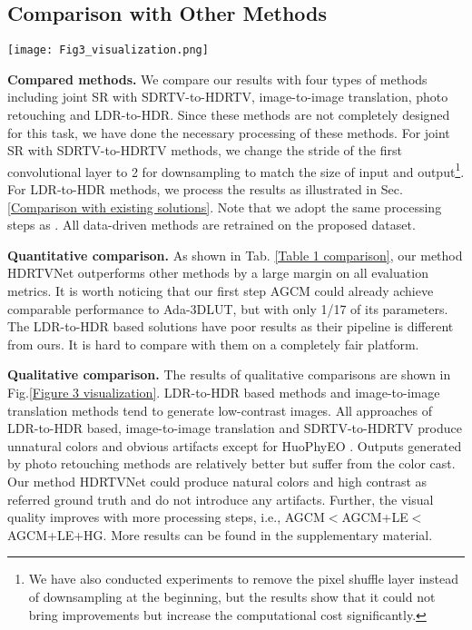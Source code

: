 \documentclass[10pt,twocolumn,letterpaper]{article}
\begin{document}
\subsection{Comparison with Other Methods}

\begin{figure*}[!t]
   \begin{center}
\texttt{[image: Fig3\_visualization.png]}
   \end{center}
   \vspace{-10pt}
      \caption{Qualitative comparisons. The top row describes the categories of algorithms.}
   \label{Figure 3 visualization}
   \end{figure*}

\textbf{Compared methods.} 
We compare our results with four types of methods including joint SR with SDRTV-to-HDRTV, image-to-image translation, photo retouching and LDR-to-HDR. Since these methods are not completely designed for this task, we have done the necessary processing of these methods. For joint SR with SDRTV-to-HDRTV methods, we change the stride of the first convolutional layer to 2 for downsampling to match the size of input and output\footnote{We have also conducted experiments to remove the pixel shuffle layer instead of downsampling at the beginning, but the results show that it could not bring improvements but increase the computational cost significantly.}. For LDR-to-HDR methods, we process the results as illustrated in Sec. \ref{Comparison with existing solutions}. Note that we adopt the same processing steps as \cite{kim2019deep, kim2020jsi}. All data-driven methods are retrained on the proposed dataset. 

\textbf{Quantitative comparison.} As shown in Tab. \ref{Table 1 comparison}, our method HDRTVNet outperforms other methods by a large margin on all evaluation metrics. It is worth noticing that our first step AGCM could already achieve comparable performance to Ada-3DLUT, but with only 1/17 of its parameters. The LDR-to-HDR based solutions have poor results as their pipeline is different from ours. It is hard to compare with them on a completely fair platform.

\textbf{Qualitative comparison.} The results of qualitative comparisons are shown in Fig.\ref{Figure 3 visualization}. LDR-to-HDR based methods and image-to-image translation methods tend to generate low-contrast images. All approaches of LDR-to-HDR based, image-to-image translation and SDRTV-to-HDRTV produce unnatural colors and obvious artifacts except for HuoPhyEO \cite{huo2014physiological}. Outputs generated by photo retouching methods are relatively better but suffer from the color cast. Our method HDRTVNet could produce natural colors and high contrast as referred ground truth and do not introduce any artifacts. Further, the visual quality improves with more processing steps, i.e., AGCM$<$AGCM+LE$<$AGCM+LE+HG. More results can be found in the supplementary material.
\end{document}
